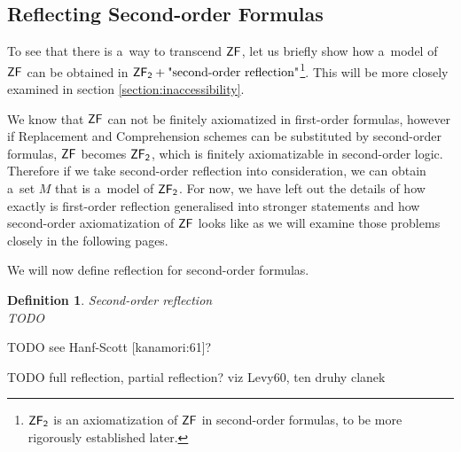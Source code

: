 \documentclass[12pt,a4paper]{article}
\newtheorem{definition}[theorem]{Definition}
\begin{document}
\subsection{Reflecting Second-order Formulas}


To see that there is a~way to transcend $\sf{ZF}$, let us briefly show how a~model of $\sf{ZF}$ can be obtained in $\sf{ZF}_2 + \mbox{"second-order reflection"}$\footnote{$\sf{ZF}_2$ is an axiomatization of $\sf{ZF}$ in second-order formulas, to be more rigorously established later.}. This will be more closely examined in section \ref{section:inaccessibility}.

We know that $\sf{ZF}$ can not be finitely axiomatized in first-order formulas, however if Replacement and Comprehension schemes can be substituted by second-order formulas, $\sf{ZF}$ becomes $\sf{ZF}_2$, which is finitely axiomatizable in second-order logic. Therefore if we take second-order reflection into consideration, we can obtain a~set $M$ that is a~model of $\sf{ZF}_2$. For now, we have left out the details of how exactly is first-order reflection generalised into stronger statements and how second-order axiomatization of $\sf{ZF}$ looks like as we will examine those problems closely in the following pages. 

We will now define reflection for second-order formulas.

\begin{definition}{Second-order reflection}\label{def:reflection}\\
TODO
\end{definition}

TODO see Hanf-Scott [kanamori:61]?

TODO full reflection, partial reflection? viz Levy60, ten druhy clanek


\end{document}
